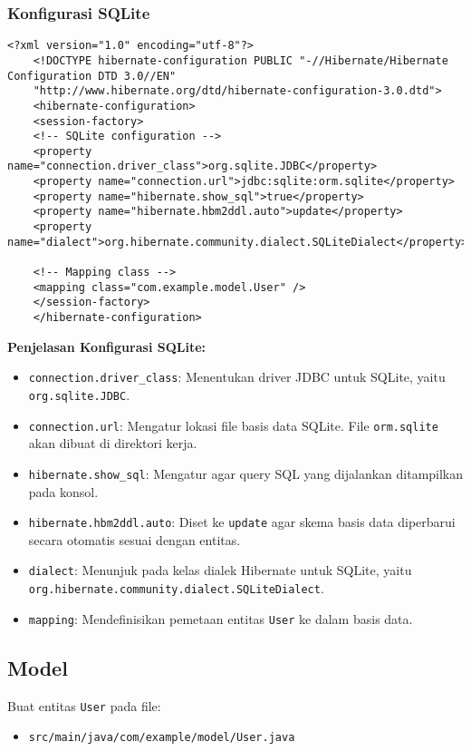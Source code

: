 \subsubsection*{Konfigurasi SQLite}
\begin{lstlisting}[style=XmlStyle]
	<?xml version="1.0" encoding="utf-8"?>
	<!DOCTYPE hibernate-configuration PUBLIC "-//Hibernate/Hibernate Configuration DTD 3.0//EN"
	"http://www.hibernate.org/dtd/hibernate-configuration-3.0.dtd">
	<hibernate-configuration>
	<session-factory>
	<!-- SQLite configuration -->
	<property name="connection.driver_class">org.sqlite.JDBC</property>
	<property name="connection.url">jdbc:sqlite:orm.sqlite</property>
	<property name="hibernate.show_sql">true</property>
	<property name="hibernate.hbm2ddl.auto">update</property>
	<property name="dialect">org.hibernate.community.dialect.SQLiteDialect</property>
	
	<!-- Mapping class -->
	<mapping class="com.example.model.User" />
	</session-factory>
	</hibernate-configuration>
\end{lstlisting}

\textbf{Penjelasan Konfigurasi SQLite:}
\begin{itemize}
	\item \texttt{connection.driver\_class}: Menentukan driver JDBC untuk SQLite, yaitu \texttt{org.sqlite.JDBC}.
	\item \texttt{connection.url}: Mengatur lokasi file basis data SQLite. File \texttt{orm.sqlite} akan dibuat di direktori kerja.
	\item \texttt{hibernate.show\_sql}: Mengatur agar query SQL yang dijalankan ditampilkan pada konsol.
	\item \texttt{hibernate.hbm2ddl.auto}: Diset ke \texttt{update} agar skema basis data diperbarui secara otomatis sesuai dengan entitas.
	\item \texttt{dialect}: Menunjuk pada kelas dialek Hibernate untuk SQLite, yaitu \texttt{org.hibernate.\-community.\-dialect.SQLiteDialect}.
	\item \texttt{mapping}: Mendefinisikan pemetaan entitas \texttt{User} ke dalam basis data.
\end{itemize}


\subsection{Model}
Buat entitas \texttt{User} pada file:
\begin{itemize}
	\item \texttt{src/main/java/com/example/model/User.java}
\end{itemize}

